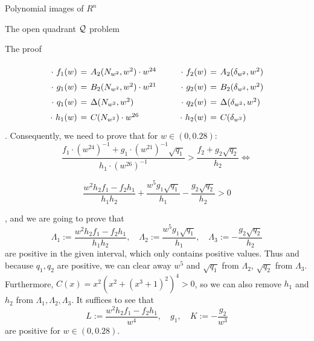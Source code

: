 \documentclass[11pt, a4paper, english, twoside, notitlepage]{report}
\begin{document}
\begin{chapter}{Polynomial images of $R^n$}
\begin{section}{The open quadrant $\mathcal{Q}$ problem}
\begin{subsection}{The proof}
\begin{Proof}
			$$
			\arraycolsep=2pt\def\arraystretch{1.5}
			\begin{array}{rclcrcl}
				\cdot\ f_1(w)&=&A_2(N_{w^2},w^2)\cdot w^{24}& \qquad &\cdot\ f_2(w)&=& A_2(\delta_{w^2},w^2)\\
				\cdot\ g_1(w)&=&B_2(N_{w^2},w^2)\cdot w^{21}& \qquad &\cdot\ g_2(w)&=&B_2(\delta_{w^2},w^2)\\
				\cdot\ q_1(w)&=&\Delta(N_{w^2},w^2)& \qquad &\cdot\ q_2(w)&=&\Delta(\delta_{w^2},w^2)\\
				\cdot\ h_1(w)&=&C(N_{w^2})\cdot w^{26}& \qquad &\cdot\ h_2(w)&=&C(\delta_{w^2})
			\end{array}
			$$
			. Consequently, we need to prove that for $w \in (0, 0.28)$:
			$$
			\frac{f_1 \cdot (w^{24})^{-1} + g_1\cdot (w^{21})^{-1}\sqrt{q_1}}{h_1 \cdot (w^{26})^{-1}}
			> 
			\frac{f_2+g_2\sqrt{q_2}}{h_2} \iff
			$$

			$$
			\frac{w^2h_2f_1-f_2h_1}{h_1h_2}+\frac{w^5g_1\sqrt{q_1}}{h_1}-\frac{g_2\sqrt{q_2}}{h_2}>0
			$$

			, and we are going to prove that 
			$$
			\Lambda_1 := \frac{w^2h_2f_1-f_2h_1}{h_1h_2},\quad\Lambda_2 := \frac{w^5g_1\sqrt{q_1}}{h_1},\quad \Lambda_3 := -\frac{g_2\sqrt{q_2}}{h_2}
			$$
			are positive in the given interval, which only contains positive values. Thus and because $q_1, q_2$ are positive, we can clear away $w^5$ and $\sqrt{q_1}$ from $\Lambda_2$, $\sqrt{q_2}$ from $\Lambda_3$. Furthermore, $C(x) = x^2(x^2+(x^3+1)^2)^4 > 0$, so we can also remove $h_1$ and $h_2$ from $\Lambda_1, \Lambda_2, \Lambda_3$. It suffices to see that
			$$
			L:=\frac{w^2h_2f_1-f_2h_1}{w^4},\quad g_1,\quad K:=-\frac{g_2}{w^3}
			$$ 
			are positive for $w \in (0,0.28)$. 
			

\end{Proof}
\end{subsection}
\end{section}
\end{chapter}
\end{document}
